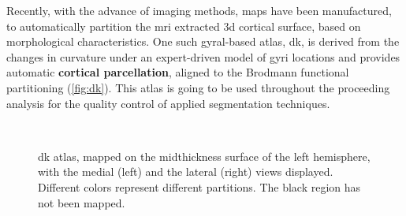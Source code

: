  Recently, with the advance of imaging methods, maps have been manufactured, to automatically partition the \ac{mri} extracted \ac{3d} cortical surface, based on morphological characteristics. One such gyral-based atlas, \ac{dk}, is derived from the changes in curvature under an expert-driven model of gyri locations \cite{Desikan2006} and provides automatic \textbf{cortical parcellation}, aligned to the Brodmann functional partitioning (\autoref{fig:dk}). This atlas is going to be used throughout the proceeding analysis for the quality control of applied segmentation techniques.
 
 \begin{figure}[H]
 	\centering
 	\\
 	\caption[Desikan-Killiany atlas on midthickness surface]{\Acl{dk} atlas, mapped on the midthickness surface of the left hemisphere, with the medial (left) and the lateral (right) views displayed.\cite{Dickie2019} Different colors represent different partitions. The black region has not been mapped.}
 	\label{fig:dk}
 \end{figure}
 
 
 
